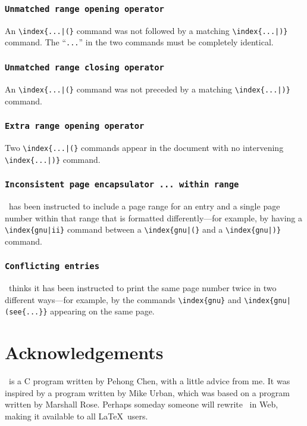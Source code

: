 \subsubsection*{\tt Unmatched range opening operator}

An \verb/\index{...|(}/ command was not followed by a matching
  \linebreak%
\verb/\index{...|)}/ command.  The ``\verb|...|'' in the two
commands must be completely identical.


\subsubsection*{\tt Unmatched range closing operator }

An \verb/\index{...|(}/ command was not preceded by a matching
  \linebreak%
\verb/\index{...|)}/ command. 

\subsubsection*{\tt Extra range opening operator }

Two \verb/\index{...|(}/ commands appear in the document with no intervening
\verb/\index{...|)}/ command.



\subsubsection*{\tt Inconsistent page encapsulator ... within range}

\MakeIndex\ has been instructed to include a page range for an entry
and a single page number within that range that is formatted
differently---for example, by having a 
\verb+\index{gnu|ii}+ command between a \verb+\index{gnu|(}+
and a \verb+\index{gnu|)}+ command.


\subsubsection*{\tt Conflicting entries}

\MakeIndex\ thinks it has been instructed to print the same page number
twice in two different ways---for example, by the commands
\verb|\index{gnu}| and \verb/\index{gnu|(see{...}}/ appearing on the
same page.



\section*{Acknowledgements}

\MakeIndex\ is a C program written by Pehong Chen, with a little
advice from me.  It was inspired by a program written by Mike Urban,
which was based on a program written by Marshall Rose.  Perhaps someday
someone will rewrite \MakeIndex\ in Web, making it available to all
\LaTeX\ users.


